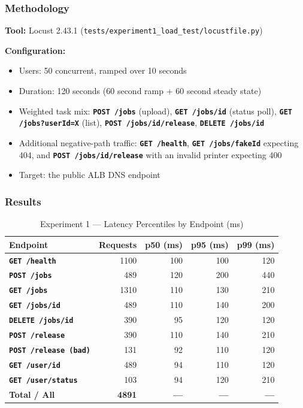 \documentclass[11pt,letterpaper]{article}
\newcommand{\code}[1]{\texttt{\small #1}}
\newcommand{\http}[1]{\textbf{\texttt{#1}}}
\begin{document}
\subsubsection{Methodology}
\textbf{Tool:} Locust 2.43.1 (\code{tests/experiment1\_load\_test/locustfile.py})

\textbf{Configuration:}
\begin{itemize}[noitemsep]
  \item Users: 50 concurrent, ramped over 10 seconds
  \item Duration: 120 seconds (60 second ramp + 60 second steady state)
  \item Weighted task mix: \http{POST /jobs} (upload), \http{GET /jobs/{id}} (status poll), \http{GET /jobs?userId=X} (list), \http{POST /jobs/{id}/release}, \http{DELETE /jobs/{id}}
  \item Additional negative-path traffic: \http{GET /health}, \http{GET /jobs/{fakeId}} expecting 404, and \http{POST /jobs/{id}/release} with an invalid printer expecting 400
  \item Target: the public ALB DNS endpoint
\end{itemize}

\subsubsection{Results}

\begin{table}[H]
\centering
\caption{Experiment 1 --- Latency Percentiles by Endpoint (ms)}
\begin{tabular}{@{}lrrrr@{}}
\toprule
\textbf{Endpoint} & \textbf{Requests} & \textbf{p50 (ms)} & \textbf{p95 (ms)} & \textbf{p99 (ms)} \\
\midrule
\http{GET /health}           & 1100 & 100 & 100 & 120 \\
\http{POST /jobs}            &  489 & 120 & 200 & 440 \\
\http{GET /jobs}             & 1310 & 110 & 130 & 210 \\
\http{GET /jobs/{id}}        &  489 & 110 & 140 & 200 \\
\http{DELETE /jobs/{id}}     &  390 &  95 & 120 & 120 \\
\http{POST /release}         &  390 & 110 & 140 & 210 \\
\http{POST /release (bad)}   &  131 &  92 & 110 & 120 \\
\http{GET /user/{id}}        &  489 &  94 & 110 & 120 \\
\http{GET /user/status}      &  103 &  94 & 120 & 210 \\
\midrule
\textbf{Total / All}         & \textbf{4891} & \textbf{---} & \textbf{---} & \textbf{---} \\
\bottomrule
\end{tabular}
\end{table}
\end{document}
